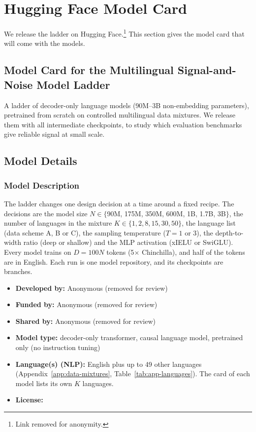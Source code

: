 \clearpage
\section{Hugging Face Model Card}
\label{app:hf_model_card}

We release the ladder on Hugging Face.\footnote{Link removed for anonymity.} This section gives the model card that will come with the models. %


\subsection*{Model Card for the Multilingual Signal-and-Noise Model Ladder}

A ladder of \nruns decoder-only language models (90M--3B non-embedding parameters), pretrained from scratch on controlled multilingual data mixtures. We release them with all intermediate checkpoints, to study which evaluation benchmarks give reliable signal at small scale.

\subsection*{Model Details}

\subsubsection*{Model Description}

The ladder changes one design decision at a time around a fixed recipe. The decisions are the model size $N \in \{$90M, 175M, 350M, 600M, 1B, 1.7B, 3B$\}$, the number of languages in the mixture $K \in \{1, 2, 8, 15, 30, 50\}$, the language list (data scheme A, B or C), the sampling temperature ($T = 1$ or 3), the depth-to-width ratio (deep or shallow) and the MLP activation (xIELU or SwiGLU). Every model trains on $D = 100N$ tokens (5$\times$ Chinchilla), and half of the tokens are in English. Each run is one model repository, and its checkpoints are branches.

\begin{itemize}
    \item \textbf{Developed by:} Anonymous (removed for review)
    \item \textbf{Funded by:} Anonymous (removed for review)
    \item \textbf{Shared by:} Anonymous (removed for review)
    \item \textbf{Model type:} decoder-only transformer, causal language model, pretrained only (no instruction tuning)
    \item \textbf{Language(s) (NLP):} English plus up to 49 other languages (Appendix~\ref{app:data-mixtures}, Table~\ref{tab:app-languages}). The card of each model lists its own $K$ languages.
    \item \textbf{License:} 
\end{itemize}

